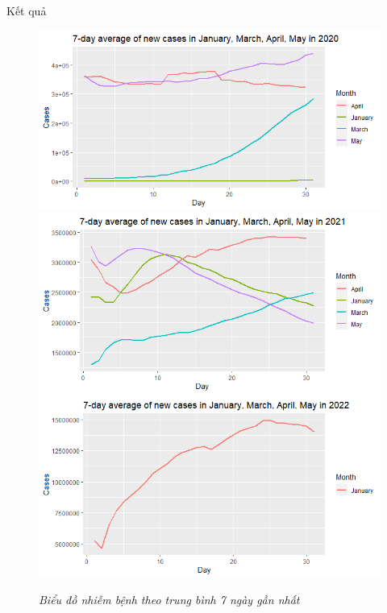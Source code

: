 \documentclass[a4paper]{article}
\theoremstyle{definition}
\begin{document}
\begin{enumerate}[1)]
Kết quả
    \begin{figure}[H]
        \begin{center}
        \includegraphics[scale = 0.5]{viii/2020cases.png}
        \includegraphics[scale = 0.5]{viii/2021cases.png}
        \includegraphics[scale = 0.5]{viii/2022cases.png}
        \end{center}
        \vspace{+3mm}\caption{\it Biểu đồ nhiễm bệnh theo trung bình 7 ngày gần nhất}
    \end{figure}
    

\end{enumerate}
\end{document}
